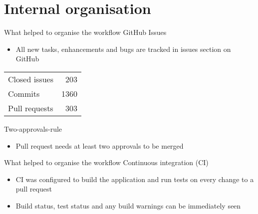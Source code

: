 \section{Internal organisation}
\begin{frame}{What helped to organise the workflow}
GitHub Issues
\begin{itemize}
	\item{All new tasks, enhancements and bugs are tracked in issues section on GitHub}
\end{itemize}
\begin{center}
\begin{tabular}{l r}
Closed issues & 203\\
Commits & 1360\\
Pull requests & 303\\
\end{tabular}
\end{center}
Two-approvals-rule
\begin{itemize}
	\item{Pull request needs at least two approvals to be merged}
\end{itemize}
\end{frame}

\begin{frame}{What helped to organise the workflow}
Continuous integration (CI) 
\begin{itemize}
	\item{CI was configured to build the application and run tests on every change to a pull request}
	\item{Build status, test status and any build warnings can be immediately seen}
\end{itemize}
\end{frame}
